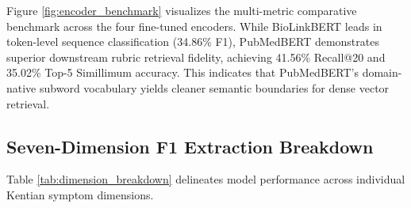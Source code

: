 Figure \ref{fig:encoder_benchmark} visualizes the multi-metric comparative benchmark across the four fine-tuned encoders. While BioLinkBERT leads in token-level sequence classification (34.86\% F1), PubMedBERT demonstrates superior downstream rubric retrieval fidelity, achieving 41.56\% Recall@20 and 35.02\% Top-5 Simillimum accuracy. This indicates that PubMedBERT's domain-native subword vocabulary yields cleaner semantic boundaries for dense vector retrieval.

\subsection{Seven-Dimension F1 Extraction Breakdown}
Table \ref{tab:dimension_breakdown} delineates model performance across individual Kentian symptom dimensions.

\begin{table}[htbp]
\caption[Per-Dimension F1 Breakdown]{Per-Dimension F1 Performance Breakdown Across Biomedical Encoders.}
\label{tab:dimension_breakdown}
\centering
\small
{}
\end{table}


